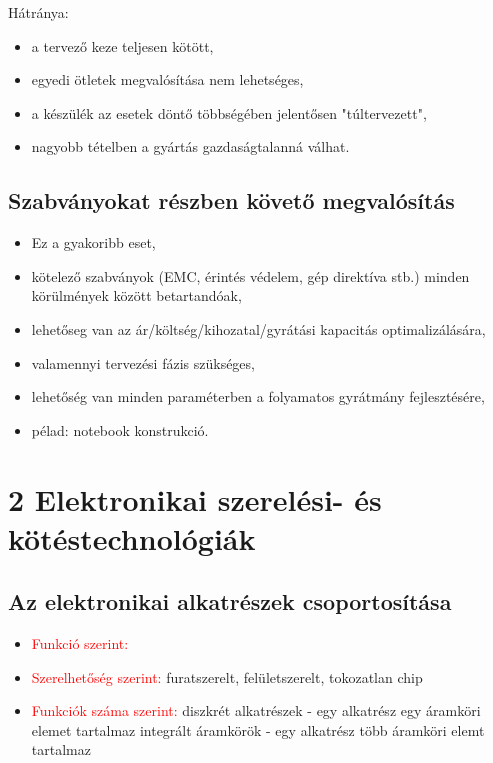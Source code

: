 \documentclass[11pt]{article}
\begin{document}
			Hátránya:

			\begin{itemize}
				\item a tervező keze teljesen kötött,
				\item egyedi ötletek megvalósítása nem lehetséges,
				\item a készülék az esetek döntő többségében jelentősen "túltervezett",
				\item nagyobb tételben a gyártás gazdaságtalanná válhat.
			\end{itemize}

		\subsection{Szabványokat részben követő megvalósítás}

			\begin{itemize}
				\item Ez a gyakoribb eset, 
				\item kötelező szabványok (EMC, érintés védelem, gép direktíva stb.) minden körülmények között betartandóak,
				\item lehetőseg van az ár/költség/kihozatal/gyrátási kapacitás optimalizálására,
				\item valamennyi tervezési fázis szükséges,
				\item lehetőség van minden paraméterben a folyamatos gyrátmány fejlesztésére,
				\item pélad: notebook konstrukció.
			\end{itemize}

	\section{2 Elektronikai szerelési- és kötéstechnológiák}

		\subsection{Az elektronikai alkatrészek csoportosítása}

			\begin{itemize}
				\item \textcolor{red}{Funkció szerint:}
				\item \textcolor{red}{Szerelhetőség szerint:}
					\subitem furatszerelt, felületszerelt, tokozatlan chip
				\item \textcolor{red}{Funkciók száma szerint:}
					\subitem diszkrét alkatrészek - egy alkatrész egy áramköri elemet tartalmaz
					\subitem integrált áramkörök - egy alkatrész több áramköri elemt tartalmaz
			\end{itemize}
\end{document}
